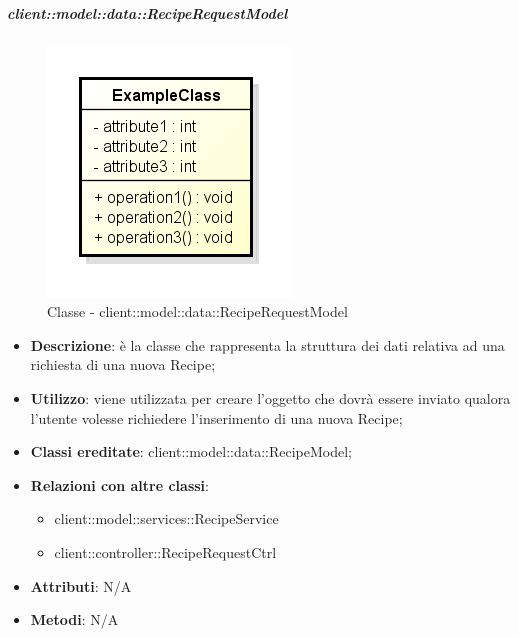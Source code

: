 		\subparagraph{client::model::data::RecipeRequestModel} %
		\label{subp:client_model_data_reciperequestmodel}
			\begin{figure}[htbp]
				\centering
				\centerline{\includegraphics[scale=0.7]{./images/client/classes/example_class.png}}
				\caption{Classe - client::model::data::RecipeRequestModel}
			\end{figure}
			\begin{itemize}
				\item \textbf{Descrizione}: è la classe che rappresenta la struttura dei dati relativa ad una richiesta di una nuova Recipe;
				\item \textbf{Utilizzo}: viene utilizzata per creare l'oggetto che dovrà essere inviato qualora l'utente volesse richiedere l'inserimento di una nuova Recipe;
				\item \textbf{Classi ereditate}: client::model::data::RecipeModel;
				\item \textbf{Relazioni con altre classi}:
					\begin{itemize}
						\item client::model::services::RecipeService
						\item client::controller::RecipeRequestCtrl
					\end{itemize}
				\item \textbf{Attributi}: N/A
				\item \textbf{Metodi}: N/A
			\end{itemize}

